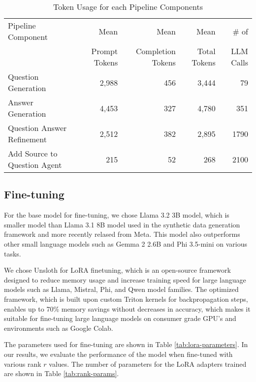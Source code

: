 \begin{table}[t]
   \centering
   \caption{Token Usage for each Pipeline Components}
   \label{tab:pipeline_tokens}
   \small
   \begin{tabular}{l r r r r}
   \toprule
   Pipeline Component & Mean & Mean & Mean & \# of \\
   & Prompt Tokens & Completion Tokens & Total Tokens & LLM Calls \\
   \midrule
   Question Generation & 2,988 & 456 & 3,444 & 79 \\
   Answer Generation & 4,453 & 327 & 4,780 & 351 \\
   Question Answer Refinement & 2,512 & 382 & 2,895 & 1790 \\
   Add Source to Question Agent & 215 & 52 & 268 & 2100 \\
   \bottomrule
   \end{tabular}
\end{table}
\subsection{Fine-tuning}


For the base model for fine-tuning, we chose Llama 3.2 3B model, which is smaller model than Llama 3.1 8B model used in the synthetic data generation framework and more
recently relased from Meta. This model also outperforms other small language models such as Gemma 2 2.6B and Phi 3.5-mini on various tasks.

We chose Unsloth for LoRA finetuning, which is an open-source framework designed to reduce memory usage and increase training speed for large language models such as Llama, Mistral,
Phi, and Qwen model families. The optimized framework, which is built upon custom Triton kernels for backpropagation steps, enables up to 70\% memory savings without decreases in
accuracy, which makes it suitable for fine-tuning large language models on consumer grade GPU's and environments such as Google Colab.

The parameters used for fine-tuning are shown in Table \ref{tab:lora-parameters}. In our results, we evaluate the performance of the model when fine-tuned with various rank $\mathit{r}$ values.
The number of parameters for the LoRA adapters trained are shown in Table \ref{tab:rank-params}.


